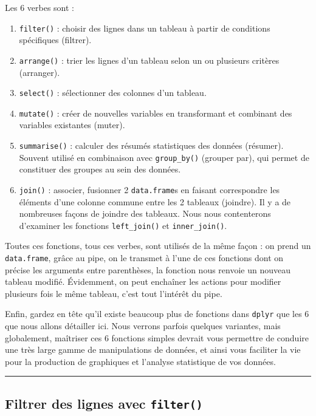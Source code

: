 \documentclass[a4paperpaper,]{article}
\providecommand{\tightlist}{%
  \setlength{\itemsep}{0pt}\setlength{\parskip}{0pt}}
\begin{document}
Les 6 verbes sont :

\begin{enumerate}
\def\labelenumi{\arabic{enumi}.}
\tightlist
\item
  \texttt{filter()} : choisir des lignes dans un tableau à partir de conditions spécifiques (filtrer).
\item
  \texttt{arrange()} : trier les lignes d'un tableau selon un ou plusieurs critères (arranger).
\item
  \texttt{select()} : sélectionner des colonnes d'un tableau.
\item
  \texttt{mutate()} : créer de nouvelles variables en transformant et combinant des variables existantes (muter).
\item
  \texttt{summarise()} : calculer des résumés statistiques des données (résumer). Souvent utilisé en combinaison avec \texttt{group\_by()} (grouper par), qui permet de constituer des groupes au sein des données.
\item
  \texttt{join()} : associer, fusionner 2 \texttt{data.frame}s en faisant correspondre les éléments d'une colonne commune entre les 2 tableaux (joindre). Il y a de nombreuses façons de joindre des tableaux. Nous nous contenterons d'examiner les fonctions \texttt{left\_join()} et \texttt{inner\_join()}.
\end{enumerate}

Toutes ces fonctions, tous ces verbes, sont utilisés de la même façon : on prend un \texttt{data.frame}, grâce au pipe, on le transmet à l'une de ces fonctions dont on précise les arguments entre parenthèses, la fonction nous renvoie un nouveau tableau modifié. Évidemment, on peut enchaîner les actions pour modifier plusieurs fois le même tableau, c'est tout l'intérêt du pipe.

Enfin, gardez en tête qu'il existe beaucoup plus de fonctions dans \texttt{dplyr} que les 6 que nous allons détailler ici. Nous verrons parfois quelques variantes, mais globalement, maîtriser ces 6 fonctions simples devrait vous permettre de conduire une très large gamme de manipulations de données, et ainsi vous faciliter la vie pour la production de graphiques et l'analyse statistique de vos données.

\begin{center}\rule{0.5\linewidth}{\linethickness}\end{center}

\hypertarget{filtrer-des-lignes-avec-filter}{%
\subsection{\texorpdfstring{Filtrer des lignes avec \texttt{filter()}}{Filtrer des lignes avec filter()}}\label{filtrer-des-lignes-avec-filter}}
\end{document}
